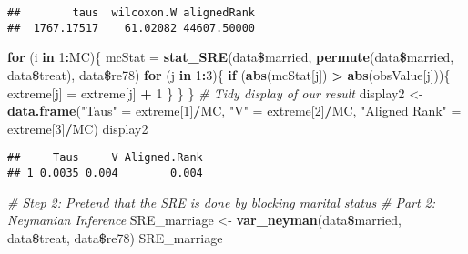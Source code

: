 \documentclass[]{article}
\newenvironment{Shaded}{\begin{snugshade}}{\end{snugshade}}
\newcommand{\KeywordTok}[1]{\textcolor[rgb]{0.13,0.29,0.53}{\textbf{#1}}}
\newcommand{\DecValTok}[1]{\textcolor[rgb]{0.00,0.00,0.81}{#1}}
\newcommand{\StringTok}[1]{\textcolor[rgb]{0.31,0.60,0.02}{#1}}
\newcommand{\CommentTok}[1]{\textcolor[rgb]{0.56,0.35,0.01}{\textit{#1}}}
\newcommand{\ControlFlowTok}[1]{\textcolor[rgb]{0.13,0.29,0.53}{\textbf{#1}}}
\newcommand{\OperatorTok}[1]{\textcolor[rgb]{0.81,0.36,0.00}{\textbf{#1}}}
\newcommand{\NormalTok}[1]{#1}
\begin{document}
\begin{verbatim}
##        taus  wilcoxon.W alignedRank 
##  1767.17517    61.02082 44607.50000
\end{verbatim}

\begin{Shaded}
\begin{Highlighting}[]
\ControlFlowTok{for}\NormalTok{ (i }\ControlFlowTok{in} \DecValTok{1}\OperatorTok{:}\NormalTok{MC)\{}
\NormalTok{  mcStat =}\StringTok{ }\KeywordTok{stat_SRE}\NormalTok{(data}\OperatorTok{\$}\NormalTok{married, }\KeywordTok{permute}\NormalTok{(data}\OperatorTok{\$}\NormalTok{married, data}\OperatorTok{\$}\NormalTok{treat), data}\OperatorTok{\$}\NormalTok{re78)}
  \ControlFlowTok{for}\NormalTok{ (j }\ControlFlowTok{in} \DecValTok{1}\OperatorTok{:}\DecValTok{3}\NormalTok{)\{}
    \ControlFlowTok{if}\NormalTok{ (}\KeywordTok{abs}\NormalTok{(mcStat[j]) }\OperatorTok{>}\StringTok{ }\KeywordTok{abs}\NormalTok{(obsValue[j]))\{}
\NormalTok{      extreme[j] =}\StringTok{ }\NormalTok{extreme[j] }\OperatorTok{+}\StringTok{ }\DecValTok{1}
\NormalTok{    \}}
\NormalTok{  \}}
\NormalTok{\}}
\CommentTok{# Tidy display of our result}
\NormalTok{display2 <-}\StringTok{ }\KeywordTok{data.frame}\NormalTok{(}\StringTok{"Taus"}\NormalTok{ =}\StringTok{ }\NormalTok{extreme[}\DecValTok{1}\NormalTok{]}\OperatorTok{/}\NormalTok{MC, }\StringTok{"V"}\NormalTok{ =}\StringTok{ }\NormalTok{extreme[}\DecValTok{2}\NormalTok{]}\OperatorTok{/}\NormalTok{MC, }\StringTok{"Aligned Rank"}\NormalTok{ =}\StringTok{ }\NormalTok{extreme[}\DecValTok{3}\NormalTok{]}\OperatorTok{/}\NormalTok{MC)}
\NormalTok{display2}
\end{Highlighting}
\end{Shaded}

\begin{verbatim}
##     Taus     V Aligned.Rank
## 1 0.0035 0.004        0.004
\end{verbatim}

\begin{Shaded}
\begin{Highlighting}[]
\CommentTok{# Step 2: Pretend that the SRE is done by blocking marital status}
\CommentTok{# Part 2: Neymanian Inference}
\NormalTok{SRE_marriage <-}\StringTok{ }\KeywordTok{var_neyman}\NormalTok{(data}\OperatorTok{\$}\NormalTok{married, data}\OperatorTok{\$}\NormalTok{treat, data}\OperatorTok{\$}\NormalTok{re78)}
\NormalTok{SRE_marriage}
\end{Highlighting}
\end{Shaded}
\end{document}
